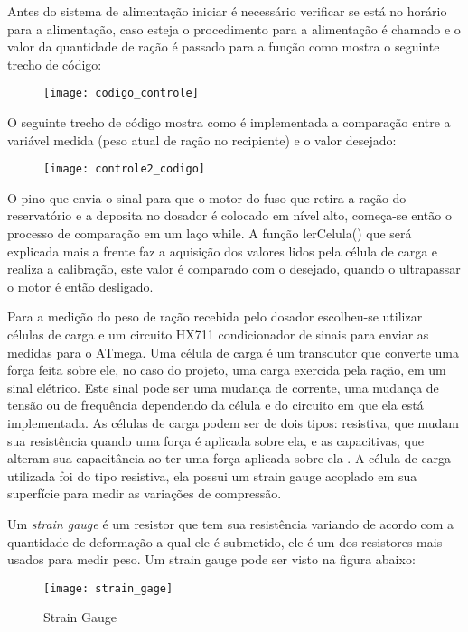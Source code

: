Antes do sistema de alimentação iniciar é necessário verificar se está no horário para a alimentação, caso esteja o procedimento para a alimentação é chamado e o valor da quantidade de ração é passado para a função como mostra o seguinte trecho de código:

\begin{figure}[!h]
\centering \texttt{[image: codigo\_controle]}
\label{codigo_controle1}
 \end{figure}

O seguinte trecho de código mostra como é implementada a comparação entre a variável medida (peso atual de ração no recipiente) e o valor desejado:

\begin{figure}[!h]
\centering \texttt{[image: controle2\_codigo]}
\label{codigo_controle2}
 \end{figure}

O pino que envia o sinal para que o motor do fuso que retira a ração do reservatório e a deposita no dosador é colocado em nível alto, começa-se então o processo de comparação  em um laço while. A função lerCelula() que será explicada mais a frente faz a aquisição dos valores lidos pela célula de carga e realiza a calibração, este valor é comparado com o desejado, quando o ultrapassar o motor é então desligado.

Para a medição do peso de ração recebida pelo dosador escolheu-se utilizar células de carga e um circuito HX711 condicionador de sinais para enviar as medidas para o ATmega. Uma célula de carga é um transdutor que converte uma força feita sobre ele, no caso do projeto, uma carga exercida pela ração, em um sinal elétrico. Este sinal pode ser uma mudança de corrente, uma mudança de tensão ou de frequência dependendo da célula e do circuito em que ela está implementada. As células de carga podem ser de dois tipos: resistiva, que mudam sua resistência quando uma força é aplicada sobre ela, e as capacitivas, que alteram sua capacitância ao ter uma força aplicada sobre ela \cite{loadcell}. A célula de carga utilizada foi do tipo resistiva, ela possui um strain gauge acoplado em sua superfície para medir as variações de compressão.

Um \textit{strain gauge} é um resistor que tem sua resistência variando de acordo com a quantidade de deformação a qual ele é submetido, ele é um dos resistores mais usados para medir peso.  Um strain gauge pode ser visto na figura abaixo:

\begin{figure}[!h]
\centering \texttt{[image: strain\_gage]}
\caption{Strain Gauge}
\label{straingauge}
 \end{figure}

